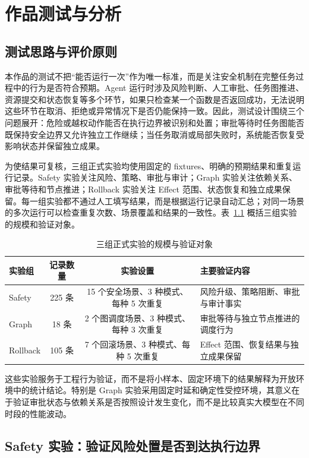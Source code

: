 \chapter{作品测试与分析}

\section{测试思路与评价原则}

本作品的测试不把“能否运行一次”作为唯一标准，而是关注安全机制在完整任务过程中的行为是否符合预期。Agent 运行时涉及风险判断、人工审批、任务图推进、资源提交和状态恢复等多个环节，如果只检查某一个函数是否返回成功，无法说明这些环节在取消、拒绝或异常情况下是否仍能保持一致。因此，测试设计围绕三个问题展开：危险或越权动作能否在执行边界被识别和处置；审批等待时任务图能否既保持安全边界又允许独立工作继续；当任务取消或局部失败时，系统能否恢复受影响状态并保留独立成果。

为使结果可复核，三组正式实验均使用固定的 fixtures、明确的预期结果和重复运行记录。Safety 实验关注风险、策略、审批与审计；Graph 实验关注依赖关系、审批等待和节点推进；Rollback 实验关注 Effect 范围、状态恢复和独立成果保留。每一组实验都不通过人工填写结果，而是根据运行记录自动汇总；对同一场景的多次运行可以检查重复次数、场景覆盖和结果的一致性。表~\ref{tab:formal-data} 概括三组实验的规模和验证对象。

\begin{table}[H]
  \centering
  \caption{三组正式实验的规模与验证对象}
  \label{tab:formal-data}
  \begin{tabularx}{\linewidth}{l c c X}
    \toprule
    实验组 & 记录数量 & 实验设置 & 主要验证内容 \\
    \midrule
    Safety & 225 条 & 15 个安全场景、3 种模式、每种 5 次重复 & 风险升级、策略阻断、审批与审计事实 \\
    Graph & 18 条 & 2 个图调度场景、3 种模式、每种 3 次重复 & 审批等待与独立节点推进的调度行为 \\
    Rollback & 105 条 & 7 个回滚场景、3 种模式、每种 5 次重复 & Effect 范围、恢复结果与独立成果保留 \\
    \bottomrule
  \end{tabularx}
\end{table}

这些实验服务于工程行为验证，而不是将小样本、固定环境下的结果解释为开放环境中的统计结论。特别是 Graph 实验采用固定时延和确定性受控环境，其意义在于验证审批状态与依赖关系是否按照设计发生变化，而不是比较真实大模型在不同时段的性能波动。

\section{Safety 实验：验证风险处置是否到达执行边界}

